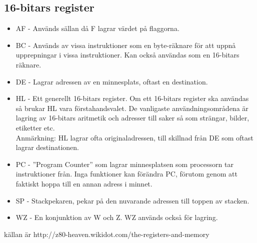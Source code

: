\documentclass{article}
\begin{document}
\subsection{16-bitars register}
\begin{itemize}
    \item AF - Används sällan då F lagrar värdet på flaggorna.
    \item BC - Används av vissa instruktioner som en byte-räknare för att uppnå upprepningar i vissa instruktioner. Kan också användas som en 16-bitars räknare.
    \item DE - Lagrar adressen av en minnesplats, oftast en destination.
    \item HL - Ett generellt 16-bitars register. Om ett 16-bitars register ska användas så brukar HL vara förstahandsvalet. De vanligaste användningsområdena är lagring av 16-bitars aritmetik och adresser till saker så som strängar, bilder, etiketter etc.\\
    Anmärkning: HL lagrar ofta originaladressen, till skillnad från DE som oftast lagrar destinationen.
    \item PC - ''Program Counter'' som lagrar minnesplatsen som processorn tar instruktioner från. Inga funktioner kan förändra PC, förutom genom att faktiskt hoppa till en annan adress i minnet.
    \item SP - Stackpekaren, pekar på den nuvarande adressen till toppen av stacken.
    \item WZ - En konjunktion av W och Z. WZ används också för lagring.
\end{itemize}

\cite{z80heaven}
källan är http://z80-heaven.wikidot.com/the-registers-and-memory
\clearpage


\printbibliography[heading=bibintoc]
\end{document}
